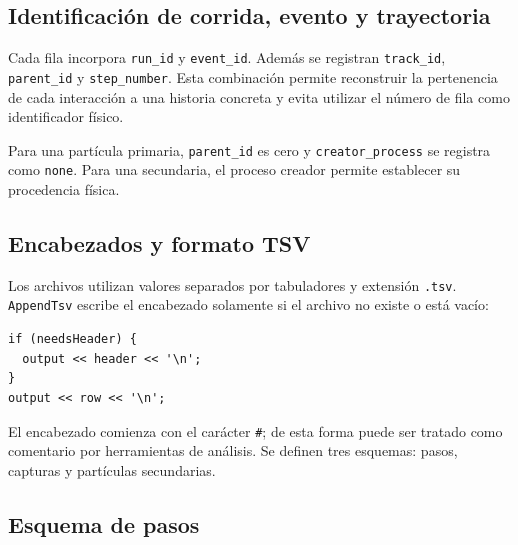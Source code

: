 \documentclass[11pt,a4paper]{article}
\newcommand{\codigo}[1]{\nolinkurl{#1}}
\begin{document}
\subsection{Identificación de corrida, evento y trayectoria}

Cada fila incorpora \codigo{run_id} y \codigo{event_id}. Además se registran
\codigo{track_id}, \codigo{parent_id} y \codigo{step_number}. Esta combinación
permite reconstruir la pertenencia de cada interacción a una historia concreta
y evita utilizar el número de fila como identificador físico.

Para una partícula primaria, \codigo{parent_id} es cero y
\codigo{creator_process} se registra como \codigo{none}. Para una secundaria,
el proceso creador permite establecer su procedencia física.

\subsection{Encabezados y formato TSV}

Los archivos utilizan valores separados por tabuladores y extensión
\codigo{.tsv}. \codigo{AppendTsv} escribe el encabezado solamente si el archivo
no existe o está vacío:

\begin{lstlisting}
if (needsHeader) {
  output << header << '\n';
}
output << row << '\n';
\end{lstlisting}

El encabezado comienza con el carácter \codigo{\#}; de esta forma puede ser
tratado como comentario por herramientas de análisis. Se definen tres esquemas:
pasos, capturas y partículas secundarias.

\subsection{Esquema de pasos}
\end{document}
